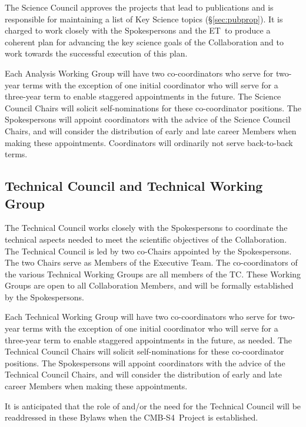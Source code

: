 \documentclass[12pt]{article}
\newcommand{\exec}{{Executive Team}}
\newcommand{\shorte}{{ET}}  %
\newcommand\collabname{CMB-S4}
\begin{document}
The Science Council approves the projects that lead to publications and is responsible for maintaining a list of Key Science topics  (\S\ref{sec:pubprop}). It is charged to work closely with the Spokespersons and the \shorte\ to produce a coherent plan for advancing the key science goals of the Collaboration and to work towards the successful execution of this plan.

Each Analysis Working Group will have two co-coordinators who  serve for two-year terms with the exception of one initial coordinator who will serve for a three-year term to enable staggered appointments in the future.  The Science Council Chairs will solicit self-nominations for these co-coordinator positions. The Spokespersons will appoint coordinators with the advice of the Science Council Chairs, and will consider the distribution of early and late career Members when making these appointments. Coordinators will ordinarily not serve back-to-back terms.


\subsection{Technical Council and Technical Working Group}
The Technical Council works closely with the Spokespersons to coordinate the technical aspects needed to meet the scientific objectives of the Collaboration.  The Technical Council is led by two co-Chairs appointed by the Spokespersons.  The two Chairs serve as Members of the \exec.   The co-coordinators of the various Technical Working Groups are all members of the TC.   These Working Groups are open to all Collaboration Members, and will be formally established by the Spokespersons.   

Each Technical Working Group will have two co-coordinators who serve for two-year terms with the exception of one initial coordinator who will serve for a three-year term to enable staggered appointments in the future, as needed.  The Technical Council Chairs will solicit self-nominations for these co-coordinator positions. The Spokespersons will appoint coordinators with the advice of the Technical Council Chairs, and will consider the distribution of early and late career Members when making these appointments.

It is anticipated that the role of and/or the need for the Technical Council will be readdressed in these Bylaws when the \collabname\ Project is established.
\end{document}
